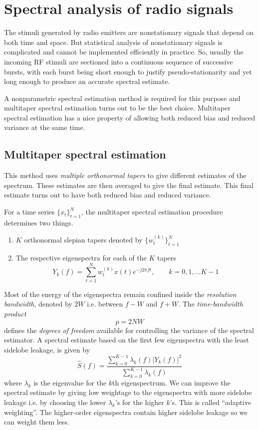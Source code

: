 \documentclass[12pt]{article}
\begin{document}
\section{Spectral analysis of radio signals}

The stimuli generated by radio emitters are nonstationary signals that depend on both time and space. But statistical analysis of nonstationary signals is complicated and cannot be implemented efficiently in practice. So, usually the incoming RF stimuli are sectioned into a continuous sequence of successive bursts, with each burst being short enough to justify pseudo-stationarity and yet long enough to produce an accurate spectral estimate\cite{haykin2005}.


A nonparametric spectral estimation method is required for this purpose and multitaper spectral estimation turns out to be the best choice. Multitaper spectral estimation has a nice property of allowing both reduced bias and reduced variance at the same time.

\subsection*{Multitaper spectral estimation}
This method uses \emph{multiple orthonormal tapers}\cite{thomson1982} to give different estimates of the spectrum. These estimates are then averaged to give the final estimate. This final estimate turns out to have both reduced bias and reduced variance\cite{percival1993}.


For a time series $\{x_t\}_{t=1}^N$, the multitaper spectral estimation procedure determines two things.
\begin{enumerate}
    \item $K$ orthonormal slepian tapers denoted by $\{w_t^{(k)}\}_{t=1}^{N}$
    \item The respective eigenspectra for each of the $K$ tapers
\begin{equation}
   Y_k(f) = \sum_{t=1}^N w_t^{(k)} x(t) e^{-j2\pi{}ft}, \qquad k = 0, 1, ...K-1
\end{equation}
\end{enumerate}

Most of the energy of the eigenspectra remain confined inside the \emph{resolution bandwidth}, denoted by $2W$ i.e. between $f-W$ and $f+W$. The \emph{time-bandwidth product}
\begin{equation}
    p = 2NW
\end{equation}
defines the \emph{degrees of freedom} available for controlling the variance of the spectral estimator.
A spectral estimate based on the first few eigenspectra with the least sidelobe leakage, is given by
\begin{equation}
    \hat{S}(f) = \frac{\sum_{k=0}^{K-1} \lambda_k(f) |Y_k(f)|^2}{\sum_{k=0}^{K-1} \lambda_k(f)}
\end{equation}
where $\lambda_k$ is the eigenvalue for the $k$th eigenspectrum. We can improve the spectral estimate by giving low weightage to the eigenspectra with more sidelobe leakage i.e. by choosing the lower $\lambda_k$'s for the higher $k$'s. This is called ``adaptive weighting''. The higher-order eigenspectra contain higher sidelobe leakage so we can weight them less.
\end{document}
